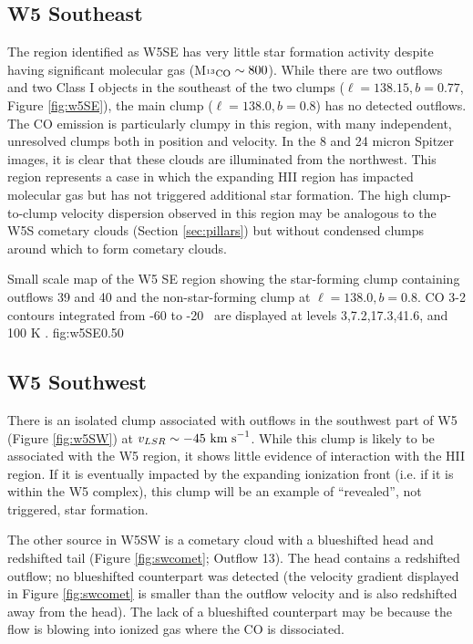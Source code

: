 \subsection{W5 Southeast}
The region identified as W5SE has very little star formation activity despite
having significant molecular gas (M$_{^{13}\textrm{CO}} \sim 800$\msun).  While
there are two outflows and two Class I objects \citep{koenig:clustered:2008} in the
southeast of the two clumps ($\ell=138.15,b=0.77$, Figure \ref{fig:w5SE}), the main clump
($\ell=138.0,b=0.8$) has no detected outflows.  The CO emission is particularly
clumpy in this region, with many independent, unresolved clumps both in
position and velocity.  In the 8 and 24 micron Spitzer images, it is clear that
these clouds are illuminated from the northwest.  This region represents a case
in which the expanding HII region has impacted molecular gas but has not
triggered additional star formation.  The high clump-to-clump velocity
dispersion observed in this region may be analogous to the W5S cometary clouds
(Section \ref{sec:pillars}) but without condensed clumps around which to form
cometary clouds.

{Small scale map of the W5 SE region showing the star-forming clump containing
outflows 39 and 40 and the non-star-forming clump at $\ell=138.0,b=0.8$. 
CO 3-2 contours integrated from -60 to -20 \kms\ are displayed at levels
3,7.2,17.3,41.6, and 100 K \kms.
}{fig:w5SE}{0.5}{0}

\subsection{W5 Southwest}
There is an isolated clump associated with outflows in the southwest part of W5
(Figure \ref{fig:w5SW}) at $v_{LSR} \sim -45~\textrm{km~s}^{-1}$.  While this clump is likely
to be associated with the W5 region, it shows little evidence of interaction
with the HII region.  If it is eventually impacted by the expanding ionization
front (i.e. if it is within the W5 complex), this clump will be an example of
``revealed'', not triggered, star formation.  

The other source in W5SW is a cometary cloud with a blueshifted head and
redshifted tail (Figure \ref{fig:swcomet}; Outflow 13).  The head contains a
redshifted outflow; no blueshifted counterpart was detected (the velocity
gradient displayed in Figure \ref{fig:swcomet} is smaller than the outflow
velocity and is also redshifted away from the head).  The lack of a blueshifted
counterpart may be because the flow is blowing into ionized gas where the CO is
dissociated.

